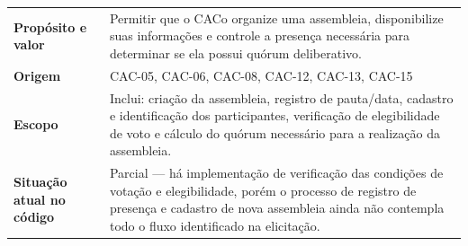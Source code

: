 \documentclass[12pt,a4paper]{article}
\begin{document}
\renewcommand{\arraystretch}{1.5}
\begin{table}[H]
    \centering
    \begin{tabular}{|m{4.5cm} | m{11cm}|}
    \hline
    
    \textbf{Propósito e valor} &
    Permitir que o CACo organize uma assembleia, disponibilize suas informações e controle a presença necessária para determinar se ela possui quórum deliberativo. \\
    
    \textbf{Origem} & CAC-05, CAC-06, CAC-08, CAC-12, CAC-13, CAC-15  \\
    
    \textbf{Escopo} &
    Inclui: criação da assembleia, registro de pauta/data, cadastro e identificação dos participantes, verificação de elegibilidade de voto e cálculo do quórum necessário para a realização da assembleia. \\
    
    
    \textbf{Situação atual no código} &
    Parcial --- há implementação de verificação das condições de votação e elegibilidade, porém o processo de registro de presença e cadastro de nova assembleia ainda não contempla todo o fluxo identificado na elicitação. \\
    
    \hline
    \end{tabular}
\end{table}

\vspace{0.5cm}
\end{document}
